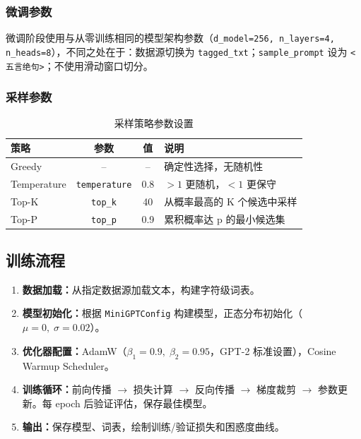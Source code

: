 \documentclass[a4paper, 12pt, centering, AutoFakeBold]{article}
\begin{document}
\subsubsection{微调参数}

微调阶段使用与从零训练相同的模型架构参数（\texttt{d\_model=256, n\_layers=4, n\_heads=8}），不同之处在于：数据源切换为 \texttt{tagged\_txt}；\texttt{sample\_prompt} 设为 \texttt{<五言绝句>}；不使用滑动窗口切分。

\subsubsection{采样参数}

\begin{table}[H]
\centering
\caption{采样策略参数设置}
\label{tab:params_sample}
\begin{tabular}{|l|c|c|l|}
\hline
\textbf{策略} & \textbf{参数} & \textbf{值} & \textbf{说明} \\
\hline
Greedy      & --           & --    & 确定性选择，无随机性 \\
Temperature & \texttt{temperature} & 0.8 & $>1$ 更随机，$<1$ 更保守 \\
Top-K       & \texttt{top\_k} & 40    & 从概率最高的 K 个候选中采样 \\
Top-P       & \texttt{top\_p} & 0.9   & 累积概率达 p 的最小候选集 \\
\hline
\end{tabular}
\end{table}

\subsection{训练流程}

\begin{enumerate}
    \item \textbf{数据加载：}从指定数据源加载文本，构建字符级词表。
    \item \textbf{模型初始化：}根据 \texttt{MiniGPTConfig} 构建模型，正态分布初始化（$\mu=0,\;\sigma=0.02$）。
    \item \textbf{优化器配置：}AdamW（$\beta_1=0.9,\;\beta_2=0.95$，GPT-2 标准设置），Cosine Warmup Scheduler。
    \item \textbf{训练循环：}前向传播 $\to$ 损失计算 $\to$ 反向传播 $\to$ 梯度裁剪 $\to$ 参数更新。每 epoch 后验证评估，保存最佳模型。
    \item \textbf{输出：}保存模型、词表，绘制训练/验证损失和困惑度曲线。
\end{enumerate}
\end{document}
